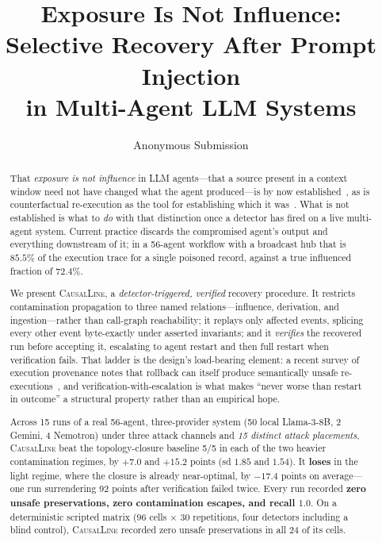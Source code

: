 \documentclass[10pt,twocolumn]{article}
\title{\bf Exposure Is Not Influence:\\
Selective Recovery After Prompt Injection\\
in Multi-Agent LLM Systems}
\author{%
Anonymous Submission
}
\date{}
\newcommand{\sys}{\textsc{CausalLine}}
\begin{document}
\maketitle

\begin{abstract}
That \emph{exposure is not influence} in LLM agents---that a source present in
a context window need not have changed what the agent produced---is by now
established~\cite{neurotaint2026,granularity2026}, as is counterfactual
re-execution as the tool for establishing which it
was~\cite{car2026,causalflow2026}. What is not established is what to
\emph{do} with that distinction once a detector has fired on a live
multi-agent system. Current practice discards the compromised agent's output
and everything downstream of it; in a 56-agent workflow with a broadcast hub
that is $85.5\%$ of the execution trace for a single poisoned record, against
a true influenced fraction of $72.4\%$.

We present \sys{}, a \emph{detector-triggered, verified} recovery procedure.
It restricts contamination propagation to three named relations---influence,
derivation, and ingestion---rather than call-graph reachability; it replays
only affected events, splicing every other event byte-exactly under asserted
invariants; and it \emph{verifies} the recovered run before accepting it,
escalating to agent restart and then full restart when verification fails.
That ladder is the design's load-bearing element: a recent survey of execution
provenance notes that rollback can itself produce semantically unsafe
re-executions~\cite{trustsurvey2026}, and verification-with-escalation is what
makes ``never worse than restart in outcome'' a structural property rather
than an empirical hope.

Across 15 runs of a real 56-agent, three-provider system (50 local
Llama-3-8B, 2 Gemini, 4 Nemotron) under three attack channels and \emph{15
distinct attack placements}, \sys{} beat the topology-closure baseline 5/5 in
each of the two heavier contamination regimes, by $+7.0$ and $+15.2$ points
(sd $1.85$ and $1.54$). It \textbf{loses} in the light regime, where the
closure is already near-optimal, by $-17.4$ points on average---one run
surrendering 92 points after verification failed twice. Every run recorded
\textbf{zero unsafe preservations, zero contamination escapes, and recall
$1.0$}. On a deterministic scripted matrix (96 cells $\times$ 30 repetitions,
four detectors including a blind control), \sys{} recorded zero unsafe
preservations in all 24 of its cells.


\end{abstract}
\end{document}
